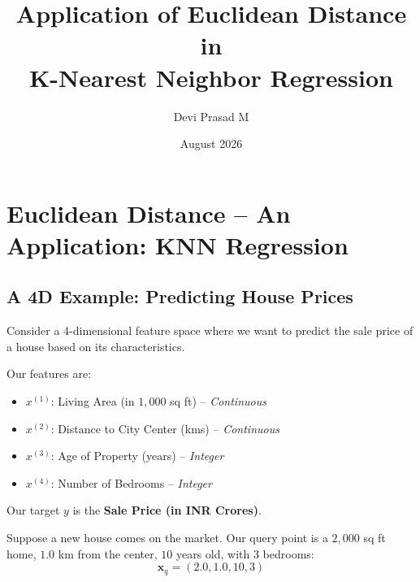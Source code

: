 \documentclass[12pt]{article}
\title{Application of Euclidean Distance \\ in \\ K-Nearest Neighbor Regression}
\author{Devi Prasad M}
\date{August 2026}
\newcommand{\MVec}[1]{\mathbf{#1}}
\begin{document}
\pagecolor{yellow!30!brown!40}

\maketitle

\section*{Euclidean Distance -- An Application: KNN Regression}

\subsection*{A 4D Example: Predicting House Prices}
Consider a 4-dimensional feature space where we want to predict
the sale price of a house based on its characteristics.

Our features are:
\begin{itemize}
    \item $x^{(1)}$: Living Area (in $1,000$ sq ft) -- \textit{Continuous}
    \item $x^{(2)}$: Distance to City Center (kms) -- \textit{Continuous}
    \item $x^{(3)}$: Age of Property (years) -- \textit{Integer}
    \item $x^{(4)}$: Number of Bedrooms -- \textit{Integer}
\end{itemize}

Our target $y$ is the \textbf{Sale Price (in INR Crores)}.

\vspace{0.5cm}
\noindent Suppose a new house comes on the market. Our query point
is a $2,000$ sq ft home, $1.0$ km from the center, $10$ years old,
with $3$ bedrooms:
\[
    \MVec{x}_q = (2.0, 1.0, 10, 3)
\]
\end{document}
